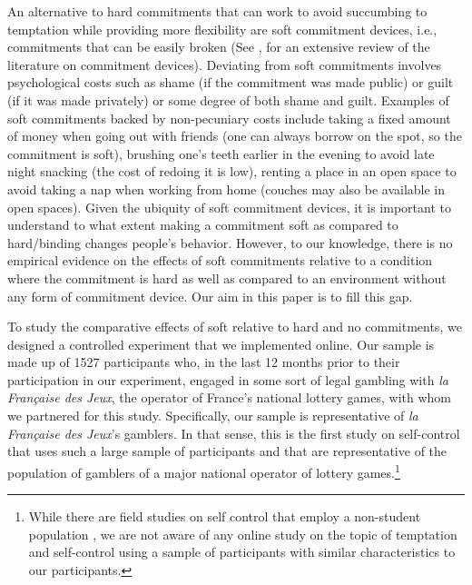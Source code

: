 \documentclass[
]{book}
\begin{document}
An alternative to hard commitments that can work to avoid succumbing to
temptation while providing more flexibility are soft commitment devices, i.e.,
commitments that can be easily broken (See \citet{bryan2010commitment}, for an
extensive review of the literature on commitment devices).
Deviating from soft commitments involves psychological costs such as shame (if
the commitment was made public) or guilt (if it was made privately) or some
degree of both shame and guilt.
Examples of soft commitments backed by non-pecuniary costs include taking a
fixed amount of money when going out with friends (one can always borrow on the
spot, so the commitment is soft), brushing one's teeth earlier in the evening to
avoid late night snacking (the cost of redoing it is low), renting a place in an
open space to avoid taking a nap when working from home (couches may also be
available in open spaces).
Given the ubiquity of soft commitment devices, it is important to understand to
what extent making a commitment soft as compared to hard/binding changes
people's behavior.
However, to our knowledge, there is no empirical evidence on the effects of
soft commitments relative to a condition where the commitment is hard as well as
compared to an environment without any form of commitment device.
Our aim in this paper is to fill this gap.

To study the comparative effects of soft relative to hard and no commitments, we
designed a controlled experiment that we implemented online.
Our sample is made up of 1527 participants who, in the last 12 months prior to their
participation in our experiment, engaged in some sort of legal gambling with
\emph{la Française des Jeux}, the operator of France's national lottery games, with
whom we partnered for this study.
Specifically, our sample is representative of \emph{la Française des Jeux}'s gamblers.
In that sense, this is the first study on self-control that uses such a large
sample of participants and that are representative of the population of gamblers
of a major national operator of lottery games.\footnote{While there are field studies on self control that employ a non-student
  population \citep{ashraf2006tying, milkman2014holding},
  we are not aware of any online study on the topic of temptation and self-control
  using a sample of participants with similar characteristics to our participants.}
\end{document}
